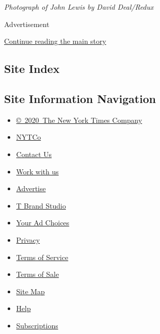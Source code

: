 \emph{Photograph of John Lewis by David Deal/Redux}

Advertisement

\protect\hyperlink{after-bottom}{Continue reading the main story}

\hypertarget{site-index}{%
\subsection{Site Index}\label{site-index}}

\hypertarget{site-information-navigation}{%
\subsection{Site Information
Navigation}\label{site-information-navigation}}

\begin{itemize}
\tightlist
\item
  \href{https://help.nytimes.com/hc/en-us/articles/115014792127-Copyright-notice}{©~2020~The
  New York Times Company}
\end{itemize}

\begin{itemize}
\tightlist
\item
  \href{https://www.nytco.com/}{NYTCo}
\item
  \href{https://help.nytimes.com/hc/en-us/articles/115015385887-Contact-Us}{Contact
  Us}
\item
  \href{https://www.nytco.com/careers/}{Work with us}
\item
  \href{https://nytmediakit.com/}{Advertise}
\item
  \href{http://www.tbrandstudio.com/}{T Brand Studio}
\item
  \href{https://www.nytimes.com/privacy/cookie-policy\#how-do-i-manage-trackers}{Your
  Ad Choices}
\item
  \href{https://www.nytimes.com/privacy}{Privacy}
\item
  \href{https://help.nytimes.com/hc/en-us/articles/115014893428-Terms-of-service}{Terms
  of Service}
\item
  \href{https://help.nytimes.com/hc/en-us/articles/115014893968-Terms-of-sale}{Terms
  of Sale}
\item
  \href{https://spiderbites.nytimes.com}{Site Map}
\item
  \href{https://help.nytimes.com/hc/en-us}{Help}
\item
  \href{https://www.nytimes.com/subscription?campaignId=37WXW}{Subscriptions}
\end{itemize}
